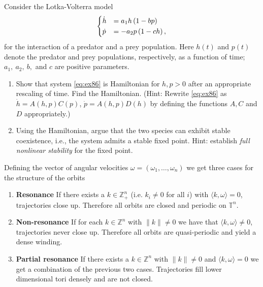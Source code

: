 \begin{exercise}
Consider the Lotka-Volterra model
\begin{align}
	\begin{dcases}
\dot{h} &=  a_{1}h\left(1-bp\right)\label{eq:ex86}\\
\dot{p} &=  -a_{2}p\left(1-ch\right),
	\end{dcases}
\end{align}
for the interaction of a predator and a prey population. Here $h(t)$ and $p(t)$ denote the predator and prey populations, respectively, as a function of time; $a_{1},\ a_{2},\ b,$ and $c$ are positive parameters.
\begin{enumerate}
	\item Show that system \eqref{eq:ex86} is Hamiltonian for $h,p>0$ after an appropriate rescaling of time. Find the Hamiltonian. (Hint: Rewrite \eqref{eq:ex86} as $\dot{h}=A(h,p)C(p)$, $\dot{p}=A(h,p)D(h)$ by defining the functions $A,C$ and $D$ appropriately.)
\item Using the Hamiltonian, argue that the two species can exhibit stable coexistence, i.e., the system admits a stable fixed point. Hint: establish \emph{full nonlinear stability }for the fixed point.
\end{enumerate}
\end{exercise}

Defining the vector of angular velocities $\omega=(\omega_1, \ldots, \omega_n)$ we get three cases for the structure of the orbits
\begin{enumerate}
	\item \textbf{Resonance} If there exists a $k\in\mathbb{Z}^{n}_{+}$ (i.e. $k_i\neq 0$ for all $i$) with $\langle k, \omega \rangle = 0$, trajectories close up. Therefore all orbits are closed and periodic on $\mathbb{T}^{n}$.
	\item \textbf{Non-resonance} If for each $k\in\mathbb{Z}^{n}$ with $\|k\|\neq 0$ we have that $\langle k, \omega \rangle \neq 0$, trajectories never close up. Therefore all orbits are quasi-periodic and yield a dense winding. 
	\item \textbf{Partial resonance} If there exists a $k\in \mathbb{Z}^{n}$ with $\|k\|\neq 0$ and $\langle k, \omega \rangle =0$ we get a combination of the previous two cases. Trajectories fill lower dimensional tori densely and are not closed.
\end{enumerate}

